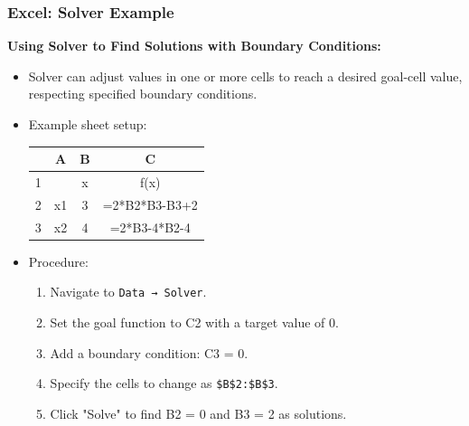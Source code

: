 \begin{frame}[fragile]
    \frametitle{Excel: Solver Example}

    \textbf{Using Solver to Find Solutions with Boundary Conditions:}
    \begin{itemize}
        \item Solver can adjust values in one or more cells to reach a desired goal-cell value, respecting specified boundary conditions.
        \item Example sheet setup:

            \begin{tabular}{|c|c|c|c|}
                \hline
                  & A & B & C \\
                \hline
                1 & & x & f(x) \\
                \hline
                2 & x1 & 3 & =2*B2*B3-B3+2 \\
                \hline
                3 & x2 & 4 & =2*B3-4*B2-4 \\
                \hline
            \end{tabular}
      
        \item Procedure:
        \begin{enumerate}
            \item Navigate to \texttt{Data → Solver}.
            \item Set the goal function to C2 with a target value of 0.
            \item Add a boundary condition: C3 = 0.
            \item Specify the cells to change as \texttt{\$B\$2:\$B\$3}.
            \item Click "Solve" to find B2 = 0 and B3 = 2 as solutions.
        \end{enumerate}
    \end{itemize}
\end{frame}
